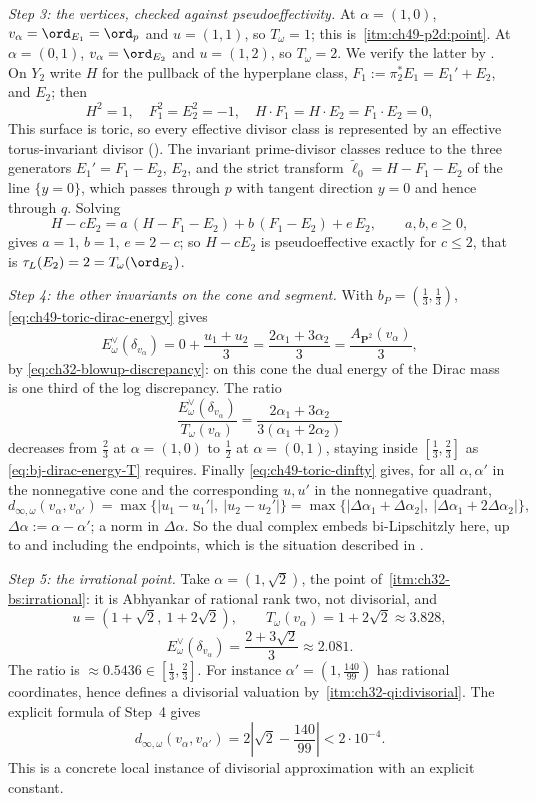\begin{example}
\emph{Step 3: the vertices, checked against pseudoeffectivity.}  At
$\alpha=(1,0)$, $v_\alpha=\ord_{E_1}=\ord_p$ and $u=(1,1)$, so
$T_\omega=1$; this is
\,\cref{itm:ch49-p2d:point}.  At
$\alpha=(0,1)$, $v_\alpha=\ord_{E_2}$ and $u=(1,2)$, so
$T_\omega=2$.  We verify the latter by
.  On $Y_2$ write $H$ for the pullback
of the hyperplane class, $F_1:=\pi_2^*E_1=E_1'+E_2$, and $E_2$; then
\[
 H^2=1,\quad F_1^2=E_2^2=-1,\quad
 H\cdot F_1=H\cdot E_2=F_1\cdot E_2=0 ,
\]
This surface is toric, so every effective divisor class is represented
by an effective torus-invariant divisor (\cite[Ch.~6]{CLS11}).
The invariant prime-divisor classes reduce to the three generators
$E_1'=F_1-E_2$, $E_2$, and the strict transform
$\widetilde\ell_0=H-F_1-E_2$ of the line $\{y=0\}$, which passes
through $p$ with tangent direction $y=0$ and hence through $q$.
Solving
\[
 H-cE_2=a\,(H-F_1-E_2)+b\,(F_1-E_2)+e\,E_2,
 \qquad a,b,e\ge0,
\]
gives $a=1$, $b=1$, $e=2-c$; so $H-cE_2$ is pseudoeffective exactly
for $c\le2$, that is $\tau_L(E_2)=2=T_\omega(\ord_{E_2})$.

\emph{Step 4: the other invariants on the cone and segment.}  With
$b_P=(\tfrac13,\tfrac13)$, \eqref{eq:ch49-toric-dirac-energy} gives
\[
 E^\vee_\omega(\delta_{v_\alpha})
 =0+\frac{u_1+u_2}{3}
 =\frac{2\alpha_1+3\alpha_2}{3}
 =\frac{A_{\mathbf P^2}(v_\alpha)}{3},
\]
by \eqref{eq:ch32-blowup-discrepancy}: on this cone the dual energy of the
Dirac mass is one third of the log discrepancy.  The ratio
\[
 \frac{E^\vee_\omega(\delta_{v_\alpha})}{T_\omega(v_\alpha)}
 =\frac{2\alpha_1+3\alpha_2}{3(\alpha_1+2\alpha_2)}
\]
decreases from $\tfrac23$ at $\alpha=(1,0)$ to $\tfrac12$ at
$\alpha=(0,1)$, staying inside $[\tfrac13,\tfrac23]$ as
\eqref{eq:bj-dirac-energy-T} requires.  Finally
\eqref{eq:ch49-toric-dinfty} gives, for all $\alpha,\alpha'$ in the
nonnegative cone and the corresponding $u,u'$ in the nonnegative quadrant,
\[
 d_{\infty,\omega}(v_\alpha,v_{\alpha'})
 =\max\{|u_1-u_1'|,\ |u_2-u_2'|\}
 =\max\bigl\{|\Delta\alpha_1+\Delta\alpha_2|,\
 |\Delta\alpha_1+2\Delta\alpha_2|\bigr\},
\]
$\Delta\alpha:=\alpha-\alpha'$; a norm in $\Delta\alpha$.  So the dual
complex embeds bi-Lipschitzly here, up to and including the endpoints,
which is the situation described in
.

\emph{Step 5: the irrational point.}  Take
$\alpha=(1,\sqrt2)$, the point of
\,\cref{itm:ch32-bs:irrational}: it is
Abhyankar of rational rank two, not divisorial, and
\[
 u=(1+\sqrt2,\ 1+2\sqrt2),
 \qquad
 T_\omega(v_\alpha)=1+2\sqrt2\approx3.828,
\]
\[
 E^\vee_\omega(\delta_{v_\alpha})=\frac{2+3\sqrt2}{3}\approx2.081 .
\]
The ratio is $\approx0.5436\in[\tfrac13,\tfrac23]$.  For instance
$\alpha'=(1,\tfrac{140}{99})$ has rational coordinates, hence defines a
divisorial valuation by
\,\cref{itm:ch32-qi:divisorial}.
The explicit formula of Step~4 gives
\[
 d_{\infty,\omega}(v_\alpha,v_{\alpha'})
 =2\left|\sqrt2-\frac{140}{99}\right|<2\cdot10^{-4}.
\]
This is a concrete local instance of divisorial approximation with an
explicit constant.
\end{example}


